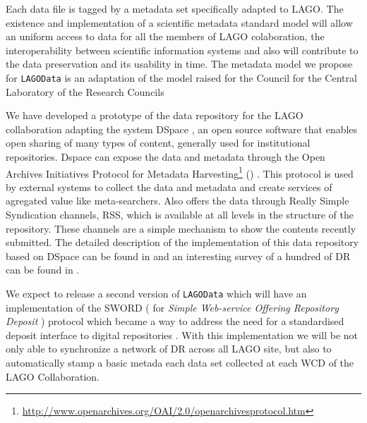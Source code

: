 Each data file is tagged by a metadata set specifically adapted to LAGO. The
existence and implementation of a scientific metadata standard model will allow
an uniform access to data for all the members of LAGO colaboration, the
interoperability between scientific information systems and also will
contribute to the data preservation and its usability in time. The metadata
model we propose for \texttt{LAGOData} is an adaptation of the model raised for
the Council for the Central Laboratory of the Research Councils \cite{Sufi2004}

We have developed a prototype of the data repository for the LAGO collaboration
adapting the system  DSpace  \cite{SmithEtal2003}, an open source software that
enables open sharing of many types of content, generally used for institutional
repositories.  Dspace can expose the data and metadata through the Open
Archives Initiatives Protocol for Metadata
Harvesting\footnote{\href{http://www.openarchives.org/OAI/2.0/openarchivesprotocol.htm}{http://www.openarchives.org/OAI/2.0/openarchivesprotocol.htm}}
(\cite{VanSopelEtal2004}) . This protocol is used  by external systems to
collect the data and metadata and create services of agregated value like
meta-searchers. Also offers the data through Really Simple Syndication
channels, RSS, which is available at all levels in the structure of the
repository. These channels are a simple mechanism to show the contents recently
submitted. The detailed description of the implementation of this data
repository based on DSpace can be found in \cite{TorresEtAl2011} and an
interesting survey of a hundred of DR can be found in
\cite{MarcialHemminger2010}.

We expect to release a second version of \texttt{LAGOData} which will have an
implementation of the SWORD ( for \textit{Simple Web-service Offering
Repository Deposit}  ) protocol which became a way to address the need for a
standardised deposit interface to digital repositories
\cite{LewisDeCastroJones2012}. With this implementation  we will be not only
able to synchronize a network of DR across all LAGO site, but also to
automatically stamp a basic metada each data set collected at each WCD of the
LAGO Collaboration.
 
